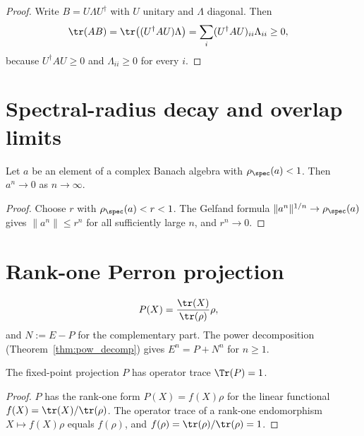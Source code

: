 \begin{proof}\leanok
    Write $B=U\Lambda U^\dagger$ with $U$ unitary and $\Lambda$ diagonal.
    Then
    \begin{align}
        \tr(AB)
         & =\tr\!\left((U^\dagger AU)\Lambda\right)
        =\sum_i(U^\dagger AU)_{ii}\Lambda_{ii}
        \geq0,
        \notag
    \end{align}
    because $U^\dagger AU\geq0$ and $\Lambda_{ii}\geq0$ for every $i$.
\end{proof}

\section{Spectral-radius decay and overlap limits}
\label{sec:app_spectral_decay}

\begin{lemma}%
    \label{lem:spectral_radius_pow_zero}
    \leanok
    Let $a$ be an element of a complex Banach algebra with
    $\rho_{\spec}(a)<1$. Then $a^n\to0$ as $n\to\infty$.
\end{lemma}

\begin{proof}
    \leanok
    Choose $r$ with $\rho_{\spec}(a)<r<1$. The Gelfand formula
    $\|a^n\|^{1/n}\to\rho_{\spec}(a)$ gives $\|a^n\|\leq r^n$ for all
    sufficiently large $n$, and $r^n\to0$.
\end{proof}

\section{Rank-one Perron projection}
\label{sec:app_spectral_perron_projection}

\begin{align}
    P(X)
     & =\frac{\tr(X)}{\tr(\rho)}\rho,
    \notag
\end{align}
and $N:=E-P$ for the complementary part. The power decomposition
(Theorem~\ref{thm:pow_decomp}) gives
$E^n=P+N^n$ for $n\geq1$.

\begin{lemma}\label{lem:fixedPointProj_trace}
    \leanok
    The fixed-point projection $P$ has operator trace $\Tr(P)=1$.
\end{lemma}

\begin{proof}\leanok
    $P$ has the rank-one form $P(X)=f(X)\rho$ for the linear functional
    $f(X)=\tr(X)/\tr(\rho)$. The operator trace of a rank-one endomorphism
    $X\mapsto f(X)\rho$ equals $f(\rho)$, and
    $f(\rho)=\tr(\rho)/\tr(\rho)=1$.
\end{proof}

